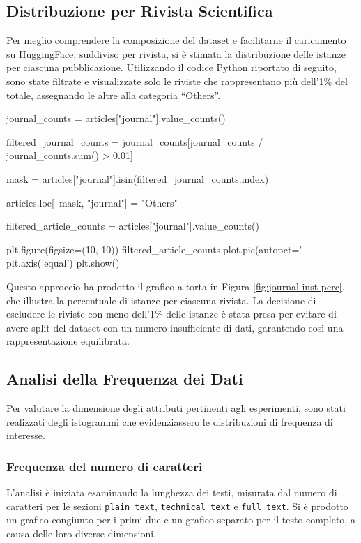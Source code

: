 \documentclass[12pt,a4paper,twoside,openright]{book}
\begin{document}
\subsection{Distribuzione per Rivista Scientifica}
Per meglio comprendere la composizione del dataset e facilitarne il caricamento su HuggingFace, suddiviso per rivista, si è stimata la distribuzione delle istanze per ciascuna pubblicazione. Utilizzando il codice Python riportato di seguito, sono state filtrate e visualizzate solo le riviste che rappresentano più dell'1\% del totale, assegnando le altre alla categoria ``Others''.

\begin{python}[caption={Codice Python per graficare la distribuzione delle riviste.}, label={lst:py-distrib-riv}]
journal_counts = articles["journal"].value_counts()

filtered_journal_counts = journal_counts[journal_counts / journal_counts.sum() > 0.01]

mask = articles["journal"].isin(filtered_journal_counts.index)

articles.loc[~mask, "journal"] = "Others"

filtered_article_counts = articles["journal"].value_counts()

plt.figure(figsize=(10, 10))
filtered_article_counts.plot.pie(autopct='%
plt.axis('equal')
plt.show()
\end{python}

Questo approccio ha prodotto il grafico a torta in Figura \ref{fig:journal-inst-perc}, che illustra la percentuale di istanze per ciascuna rivista. La decisione di escludere le riviste con meno dell'1\% delle istanze è stata presa per evitare di avere split del dataset con un numero insufficiente di dati, garantendo così una rappresentazione equilibrata.


\subsection{Analisi della Frequenza dei Dati}
Per valutare la dimensione degli attributi pertinenti agli esperimenti, sono stati realizzati degli istogrammi che evidenziassero le distribuzioni di frequenza di interesse.

\subsubsection{Frequenza del numero di caratteri}
L'analisi è iniziata esaminando la lunghezza dei testi, misurata dal numero di caratteri per le sezioni \texttt{plain\_text}, \texttt{technical\_text} e \texttt{full\_text}. Si è prodotto un grafico congiunto per i primi due e un grafico separato per il testo completo, a causa delle loro diverse dimensioni.
\end{document}
